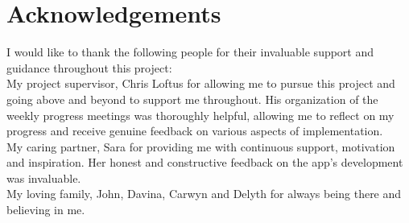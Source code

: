 \thispagestyle{empty}


\section*{\centering Acknowledgements}

I would like to thank the following people for their invaluable support and guidance throughout this project: \\

My project supervisor, Chris Loftus for allowing me to pursue this project and going above and beyond to support me throughout. His organization of the weekly progress meetings was thoroughly helpful, allowing me to reflect on my progress and receive genuine feedback on various aspects of implementation. \\

My caring partner, Sara for providing me with continuous support, motivation and inspiration. Her honest and constructive feedback on the app's development was invaluable. \\

My loving family, John, Davina, Carwyn and Delyth for always being there and believing in me.


